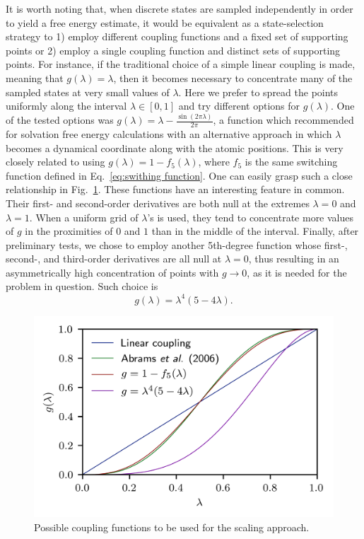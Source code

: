 \documentclass[
aip,
jcp,
reprint,
]{revtex4-1}
\begin{document}
It is worth noting that, when discrete states are sampled independently in order to yield a free energy estimate, it would be equivalent as a state-selection strategy to 1) employ different coupling functions and a fixed set of supporting points or 2) employ a single coupling function and distinct sets of supporting points.
For instance, if the traditional choice of a simple linear coupling is made, meaning that $g(\lambda) = \lambda$, then it becomes necessary to concentrate many of the sampled states at very small values of $\lambda$.
Here we prefer to spread the points uniformly along the interval $\lambda \in [0, 1]$ and try different options for $g(\lambda)$.
One of the tested options was  $g(\lambda) = \lambda-\frac{\sin(2\pi\lambda)}{2\pi}$, a function which \citeauthor{Abrams_2006} \cite{Abrams_2006} recommended for solvation free energy calculations with an alternative approach in which $\lambda$ becomes a dynamical coordinate along with the atomic positions.
This is very closely related to using $g(\lambda) = 1 - f_5(\lambda)$, where $f_5$ is the same switching function defined in Eq.~\eqref{eq:swithing function}.
One can easily grasp such a close relationship in Fig.~\ref{fig:coupling functions}.
These functions have an interesting feature in common.
Their first- and second-order derivatives are both null at the extremes $\lambda = 0$ and $\lambda=1$.
When a uniform grid of $\lambda$'s is used, they tend to concentrate more values of $g$ in the proximities of $0$ and $1$ than in the middle of the interval.
Finally, after preliminary tests, we chose to employ another 5th-degree function whose first-, second-, and third-order derivatives are all null at $\lambda=0$, thus resulting in an asymmetrically high concentration of points with $g \to 0$, as it is needed for the problem in question.
Such choice is
\begin{equation}
g(\lambda) = \lambda^4 (5 - 4 \lambda).
\end{equation}

\begin{figure}
	\centering
	\includegraphics{coupling_functions}
	\caption{Possible coupling functions to be used for the scaling approach.}
	\label{fig:coupling functions}
\end{figure}
\end{document}
